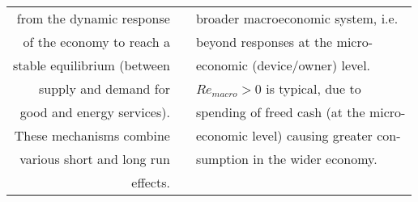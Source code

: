 \begin{table}
\begin{center}
\begin{tabular}{ r l l }
from the dynamic response          &                                              & broader macroeconomic system, i.e.\  \\
of the economy to reach a          &                                              & beyond responses at the micro-  \\
stable equilibrium (between        &                                              & economic (device/owner) level. \\
supply and demand for              &                                              & $Re_{macro} > 0$ is typical, due to   \\
good and energy services).         &                                              & spending of freed cash (at the micro-\\
These mechanisms combine           &                                              & economic level) causing greater con- \\
various short and long run         &                                              & sumption in the wider economy. \\
effects.                           &                                              &  \\
\bottomrule
\end{tabular}
\end{center}
\end{table}